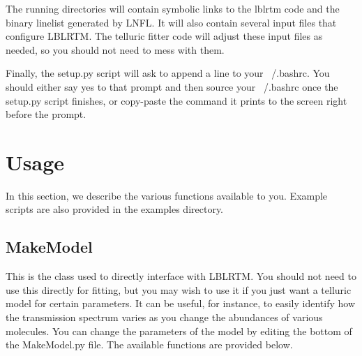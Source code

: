 \documentclass{article}
\begin{document}
The running directories will contain symbolic links to the lblrtm code and the binary linelist generated by LNFL. It will also contain several input files that configure LBLRTM. The telluric fitter code will adjust these input files as needed, so you should not need to mess with them.

Finally, the setup.py script will ask to append a line to your ~/.bashrc. You should either say yes to that prompt and then source your ~/.bashrc once the setup.py script finishes, or copy-paste the command it prints to the screen right before the prompt. 


\section{Usage}
\label{sec:usage}
In this section, we describe the various functions available to you. Example scripts are also provided in the examples directory. 

\subsection{MakeModel}
\label{subsec:makemodel}
This is the class used to directly interface with LBLRTM. You should not need to use this directly for fitting, but you may wish to use it if you just want a telluric model for certain parameters. It can be useful, for instance, to easily identify how the transmission spectrum varies as you change the abundances of various molecules. You can change the parameters of the model by editing the bottom of the MakeModel.py file. The available functions are provided below.
\end{document}
